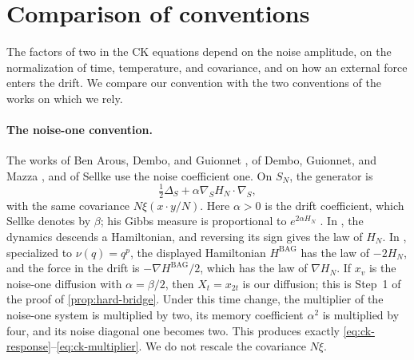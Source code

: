 \section{Comparison of conventions}\label{sec:conventions}

The factors of two in the CK equations depend on the noise amplitude, on the normalization of time, temperature, and covariance, and on how an external force enters the drift. We compare our convention with the two conventions of the works on which we rely.

\paragraph{The noise-one convention.}
The works of Ben Arous, Dembo, and Guionnet \cite{bag2006}, of Dembo, Guionnet, and Mazza \cite{dgm2007}, and of Sellke \cite{sellke2024} use the noise coefficient one. On $S_N$, the generator is
\[
 \tfrac12\Delta_S+\alpha\nabla_SH_N\cdot\nabla_S,
\]
with the same covariance $N\xi(x\cdot y/N)$. Here $\alpha>0$ is the drift coefficient, which Sellke denotes by $\beta$; his Gibbs measure is proportional to $e^{2\alpha H_N}$ \cite[arXiv version~5, Equation~(1.2) and the following paragraph, p.~2]{sellke2024}. In \cite{dgm2007}, the dynamics descends a Hamiltonian, and reversing its sign gives the law of $H_N$. In \cite[Equations~(1.2), (1.6), and~(1.7)]{bag2006}, specialized to $\nu(q)=q^p$, the displayed Hamiltonian $H^{\mathrm{BAG}}$ has the law of $-2H_N$, and the force in the drift is $-\nabla H^{\mathrm{BAG}}/2$, which has the law of $\nabla H_N$.
If $x_v$ is the noise-one diffusion with $\alpha=\beta/2$, then $X_t=x_{2t}$ is our diffusion; this is Step~1 of the proof of \cref{prop:hard-bridge}. Under this time change, the multiplier of the noise-one system is multiplied by two, its memory coefficient $\alpha^2$ is multiplied by four, and its noise diagonal one becomes two. This produces exactly \eqref{eq:ck-response}--\eqref{eq:ck-multiplier}. We do not rescale the covariance $N\xi$.

